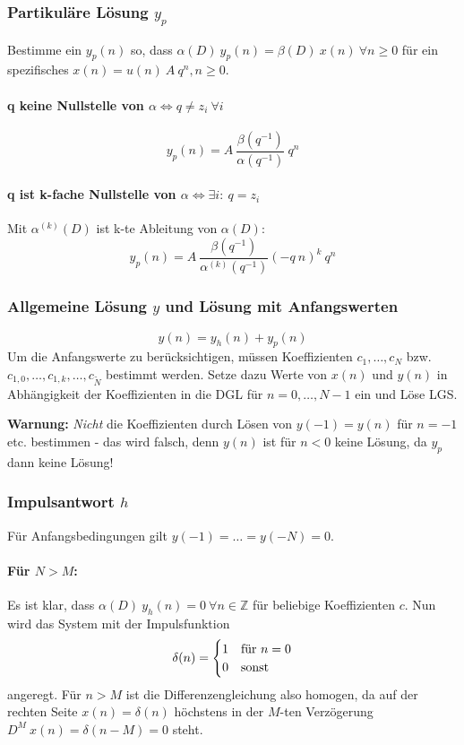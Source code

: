 \documentclass[10pt,a4paper]{article}
\begin{document}
\subsubsection*{Partikuläre Lösung $y_p$}
Bestimme ein $y_p(n)$ so, dass $\alpha(D) ~ y_p(n) = \beta(D) ~ x(n) ~ \forall n \geq 0$ für ein spezifisches $x(n) = u(n) ~ A ~ q^n, n \geq 0$.

\paragraph{q keine Nullstelle von $\alpha \Leftrightarrow q \neq z_i ~ \forall i$}
\[
	y_p(n) = A ~ \frac{\beta(q^{-1})}{\alpha(q^{-1})} ~ q^n
\]
\paragraph{q ist k-fache Nullstelle von $\alpha \Leftrightarrow \exists i: ~ q = z_i$} Mit $\alpha^{(k)}(D)$ ist k-te Ableitung von $\alpha(D)$:
\[
	y_p(n) = A ~ \frac{\beta(q^{-1})}{\alpha^{(k)}(q^{-1})} (-q ~ n)^k ~ q^n
\]

\subsubsection*{Allgemeine Lösung $y$ und Lösung mit Anfangswerten}
\[
	y(n) = y_h(n) + y_p(n)
\]
Um die Anfangswerte zu berücksichtigen, müssen Koeffizienten $c_1, …, c_N$ bzw. $c_{1,0}, …, c_{1,k}, …, c_{\tilde N}$ bestimmt werden. Setze dazu Werte von $x(n)$ und $y(n)$ in Abhängigkeit der Koeffizienten in die DGL für $n = 0, …, N - 1$ ein und Löse LGS.

\vspace{.5em}
\raggedright
\textbf{Warnung:} \textit{Nicht} die Koeffizienten durch Lösen von $y(-1) = y(n)$ für $n = -1$ etc. bestimmen - das wird falsch, denn $y(n)$ ist für $n < 0$ keine Lösung, da $y_p$ dann keine Lösung!

\subsubsection*{Impulsantwort $h$}
Für Anfangsbedingungen gilt $y(-1) = … = y(-N) = 0$.
\paragraph{Für $N > M$:} Es ist klar, dass $\alpha(D) ~ y_h(n) = 0 ~ \forall n \in \mathbb Z$ für beliebige Koeffizienten $c$. Nun wird das System mit der Impulsfunktion 
\[
	\delta(n) =
	\begin{cases}
		1 & \textnormal{für } n = 0 \\
		0 & \textnormal{sonst}
	\end{cases}
\]
angeregt. Für $n > M$ ist die Differenzengleichung also homogen, da auf der rechten Seite $x(n) = \delta(n)$ höchstens in der $M$-ten Verzögerung $D^M ~ x(n) = \delta(n - M) = 0$ steht.
\end{document}
